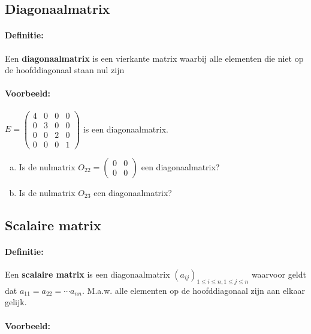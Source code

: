 \documentclass[12pt,twoside]{article}
\begin{document}
\subsection{Diagonaalmatrix}

\paragraph*{Definitie:}

Een {\bf diagonaalmatrix} is een vierkante matrix waarbij alle elementen die niet op de hoofddiagonaal staan nul zijn

\paragraph*{Voorbeeld:}

$E=
\begin{pmatrix}
  4 & 0 & 0 & 0\\ 0 & 3 & 0 & 0\\ 0 & 0 & 2 & 0\\ 0 & 0 & 0 & 1
\end{pmatrix}
$ is een diagonaalmatrix.

\begin{oefening}
  \begin{enumerate}[(a)]
  \item Is de nulmatrix $O_{22}=\begin{pmatrix}0 & 0\\ 0 & 0\end{pmatrix}$ een diagonaalmatrix?
  \item Is de nulmatrix $O_{23}$ een diagonaalmatrix?
\end{enumerate}
\end{oefening}

\subsection{Scalaire matrix}

\paragraph*{Definitie:}

Een {\bf scalaire matrix} is een diagonaalmatrix $(a_{ij})_{1 \leq i \leq n , 1 \leq j \leq n}$ waarvoor geldt dat $a_{11} = a_{22} = \cdots a_{nn}$. M.a.w. alle elementen op de hoofddiagonaal zijn aan elkaar gelijk.

\paragraph*{Voorbeeld:}
\end{document}
